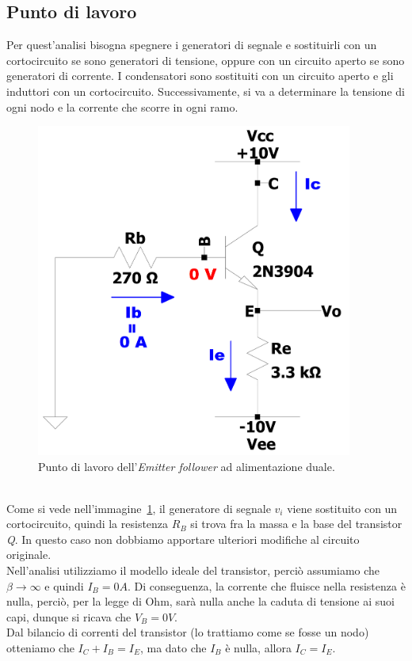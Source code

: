\documentclass{report}
\begin{document}
\subsection{Punto di lavoro} \label{puntolavoroEFv1}
Per quest'analisi bisogna spegnere i generatori di segnale e sostituirli con un cortocircuito se sono generatori di tensione, oppure con un circuito aperto se sono generatori di corrente. I condensatori sono sostituiti con un circuito aperto e gli induttori con un cortocircuito. Successivamente, si va a determinare la tensione di ogni nodo e la corrente che scorre in ogni ramo. 
\begin{figure}[h]
\centering
\includegraphics[height=11cm]{immagini/EFv1_pl}
\caption{Punto di lavoro dell'\textit{Emitter follower} ad alimentazione duale.}
\label{figura:EFv1_pl}
\end{figure}
\\Come si vede nell'immagine~\ref{figura:EFv1_pl}, il generatore di segnale $v_{i}$ viene sostituito con un cortocircuito, quindi la resistenza $R_{B}$ si trova fra la massa e la base del transistor \textit{Q}. In questo caso non dobbiamo apportare ulteriori modifiche al circuito originale. 
\\Nell'analisi utilizziamo il modello ideale del transistor, perciò assumiamo che $\displaystyle{\beta\rightarrow\infty}$ e quindi $I_{B}=0A$. Di conseguenza, la corrente che fluisce nella resistenza è nulla, perciò, per la legge di Ohm, sarà nulla anche la caduta di tensione ai suoi capi, dunque si ricava che $V_{B}=0V$. 
\\Dal bilancio di correnti del  transistor (lo trattiamo come se fosse un nodo) otteniamo che $I_C+I_B=I_E$, ma dato che $I_{B}$ è nulla, allora $I_C=I_E$.
\end{document}
